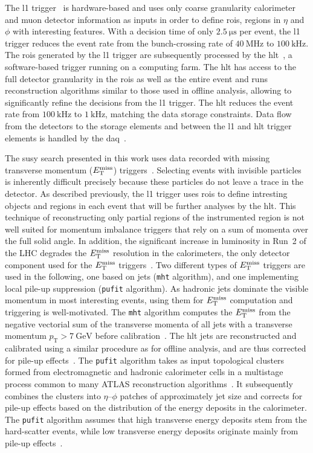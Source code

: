 The \gls{l1} trigger~\cite{CERN-LHCC-98-014} is hardware-based and uses only coarse granularity calorimeter and muon detector information as inputs in order to define \gls{rois}, \ie regions in $\eta$ and $\phi$ with interesting features. With a decision time of only $\SI{2.5}{\micro\second}$ per event, the \gls{l1} trigger reduces the event rate from the bunch-crossing rate of $\SI{40}{\MHz}$ to $\SI{100}{\kHz}$. The \gls{rois} generated by the \gls{l1} trigger are subsequently processed by the \gls{hlt}~\cite{Jenni:616089}, a software-based trigger running on a computing farm. The \gls{hlt} has access to the full detector granularity in the \gls{rois} as well as the entire event and runs reconstruction algorithms similar to those used in offline analysis, allowing to significantly refine the decisions from the \gls{l1} trigger. The \gls{hlt} reduces the event rate from $\SI{100}{\kHz}$ to $\SI{1}{\kHz}$, matching the data storage constraints. Data flow from the detectors to the storage elements and between the \gls{l1} and \gls{hlt} trigger elements is handled by the \gls{daq}~\cite{Jenni:616089}.

The \gls{susy} search presented in this work uses data recorded with missing transverse momentum ($E_{\textrm{T}}^{\textrm{miss}}$) triggers~\cite{Aad:2020les}. Selecting events with invisible particles is inherently difficult precisely because these particles do not leave a trace in the detector. As described previously, the \gls{l1} trigger uses \gls{rois} to define intresting objects and regions in each event that will be further analyses by the \gls{hlt}. This technique of reconstructing only partial regions of the instrumented region is not well suited for momentum imbalance triggers that rely on a sum of momenta over the full solid angle. In addition, the significant increase in luminosity in Run~2 of the LHC degrades the $E_{\textrm{T}}^{\textrm{miss}}$ resolution in the calorimeters, the only detector component used for the $E_{\textrm{T}}^{\textrm{miss}}$ triggers~\cite{Aad:2020les}. Two different types of $E_{\textrm{T}}^{\textrm{miss}}$ triggers are used in the following, one based on jets (\texttt{mht} algorithm), and one implementing local pile-up suppression (\texttt{pufit} algorithm). As hadronic jets dominate the visible momentum in most interesting events, using them for $E_{\textrm{T}}^{\textrm{miss}}$ computation and triggering is well-motivated. The \texttt{mht} algorithm computes the $E_{\textrm{T}}^{\textrm{miss}}$ from the negative vectorial sum of the transverse momenta of all jets with a transverse momentum $p_\mathrm{T} > \SI{7}{\GeV}$ before calibration~\cite{Aad:2020les}. The \gls{hlt} jets are reconstructed and calibrated using a similar procedure as for offline analysis, and are thus corrected for pile-up effects~\cite{Aad:2016nrq}. The \texttt{pufit} algorithm takes as input topological clusters formed from electromagnetic and hadronic calorimeter cells in a multistage process common to many ATLAS reconstruction algorithms~\cite{Aad:2016upy}. It subsequently combines the clusters into $\eta$--$\phi$ patches of approximately jet size and corrects for pile-up effects based on the distribution of the energy deposits in the calorimeter. The \texttt{pufit} algorithm assumes that high transverse energy deposits stem from the hard-scatter events, while low transverse energy deposits originate mainly from pile-up effects~\cite{Aad:2020les}.


